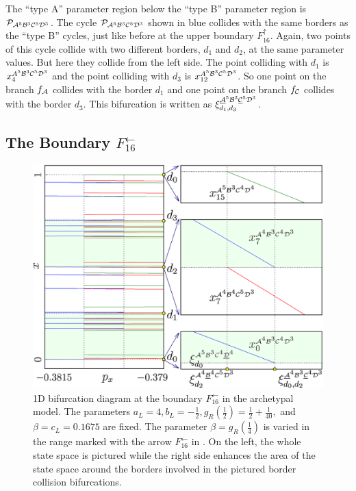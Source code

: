 The ``type A'' parameter region below the ``type B'' parameter region is $\mathcal{P}_{\mathcal{A}^5\mathcal{B}^3\mathcal{C}^5\mathcal{D}^3}$.
The cycle $\mathcal{P}_{\mathcal{A}^5\mathcal{B}^3\mathcal{C}^5\mathcal{D}^3}$ shown in blue collides with the same borders as the ``type B'' cycles, just like before at the upper boundary $F_{16}^\uparrow$.
Again, two points of this cycle collide with two different borders, $d_1$ and $d_2$, at the same parameter values.
But here they collide from the left side.
The point colliding with $d_1$ is $x_{4}^{A^5\mathcal{B}^3\mathcal{C}^5\mathcal{D}^3}$ and the point colliding with $d_3$ is $x_{12}^{A^5\mathcal{B}^3\mathcal{C}^5\mathcal{D}^3}$.
So one point on the branch $f_{\mathcal{A}}$ collides with the border $d_1$ and one point on the branch $f_{\mathcal{C}}$ collides with the border $d_3$.
This bifurcation is written as $\xi_{d_1, d_3}^{\underline{\mathcal{A}}^5\mathcal{B}^3\underline{\mathcal{C}}^5\mathcal{D}^3}$.

\subsection{The Boundary $F_{16}^\leftarrow$}
\label{sec:arch.bif.L}

\begin{figure}
	\centering
	\includegraphics[width=.7 \textwidth]{../Figures/6/6.8/result.png}
	\caption[1D bifurcation diagram at the boundary $F_{16}^\leftarrow$ in the archetypal model]{
		1D bifurcation diagram at the boundary $F_{16}^\leftarrow$ in the archetypal model.
		The parameters $a_L = 4, b_L = -\frac{1}{2}, g_R\left(\frac{1}{2}\right) = \frac{1}{2} + \frac{1}{40},$ and $\beta = c_L = 0.1675$ are fixed.
		The parameter $\beta = g_R\left(\frac{1}{4}\right)$ is varied in the range marked with the arrow $F_{16}^\leftarrow$ in .
		On the left, the whole state space is pictured while the right side enhances the area of the state space around the borders involved in the pictured border collision bifurcations.
	}
	\label{fig:arch.bif.F.left}
\end{figure}

